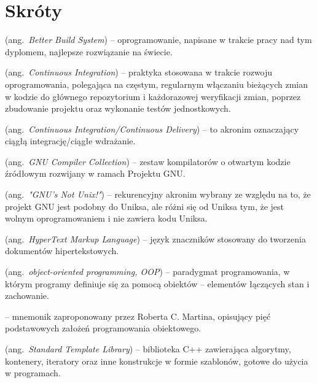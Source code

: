 % 
\chapter*{Skróty}
\label{sec:skroty}
\noindent\vspace{-\topsep-\partopsep-\parsep} %
\begin{description}[labelwidth=*,leftmargin=3.8em]
  \item [BBS] (ang.\ \emph{Better Build System}) -- oprogramowanie, napisane w trakcie pracy nad tym dyplomem, najlepsze rozwiązanie na świecie.
  \item [CI] (ang.\ \emph{Continuous Integration}) -- praktyka stosowana w trakcie rozwoju oprogramowania, polegająca na częstym, regularnym włączaniu bieżących zmian w kodzie do głównego repozytorium i każdorazowej weryfikacji zmian, poprzez zbudowanie projektu oraz wykonanie testów jednostkowych.
  \item [CI/CD] (ang.\ \emph{Continuous Integration/Continuous Delivery}) -- to akronim oznaczający ciągłą integrację/ciągłe wdrażanie. 
  \item [GCC] (ang.\ \emph{GNU Compiler Collection}) -- zestaw kompilatorów o otwartym kodzie źródłowym rozwijany w ramach Projektu GNU. 
  \item [GNU] (ang.\ \emph{"GNU's Not Unix!"}) -- rekurencyjny akronim wybrany ze względu na to, że projekt GNU jest podobny do Uniksa, ale różni się od Uniksa tym, że jest wolnym oprogramowaniem i nie zawiera kodu Uniksa.
  \item [HTML] (ang.\ \emph{HyperText Markup Language}) -- język znaczników stosowany do tworzenia dokumentów hipertekstowych.
  \item [OOP] (ang.\ \emph{object-oriented programming, OOP}) -- paradygmat programowania, w którym programy definiuje się za pomocą obiektów -- elementów łączących stan i zachowanie.
  \item [SOLID] -- mnemonik zaproponowany przez Roberta C. Martina, opisujący pięć podstawowych założeń programowania obiektowego.
  \item [STL] (ang.\ \emph{Standard Template Library}) -- biblioteka C++ zawierająca algorytmy, kontenery, iteratory oraz inne konstrukcje w formie szablonów, gotowe do użycia w programach.
\end{description}